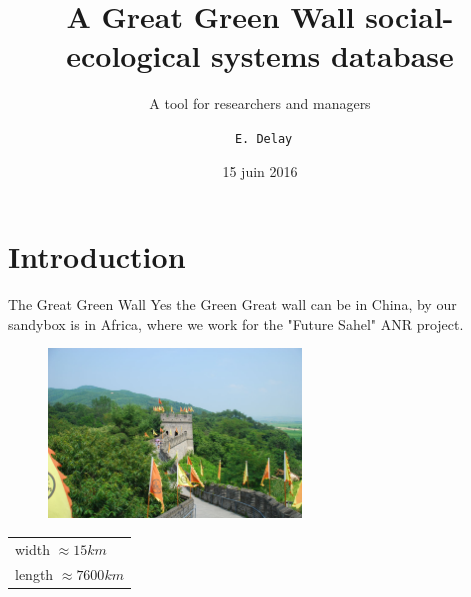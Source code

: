 \documentclass[newPxFont]{beamer}
\title{A Great Green Wall social-ecological systems database}
\subtitle{A tool for researchers and managers}
\date{15 juin 2016}
\author{\texttt{ E. Delay}}
\institute{\textsc{Ohmi} Téssékéré - Sénégal\\
\textsc{Geolab}, Université de Clermont-Auvergne.}
\newcommand{\tabitem}{%
  \usebeamertemplate{itemize item}\hspace*{\labelsep}}
\begin{document}
%
%

\maketitle


%
%


\section{Introduction}

\begin{frame}[c]{The Great Green Wall}
\vspace{-1cm}
Yes the Green Great wall can be in China, by our sandybox is in Africa, where we work for the "Future Sahel" ANR project.
\begin{figure}
	\centering
	\includegraphics[width = 0.6\textwidth]{img/great_wall}
\end{figure}
\begin{center}
    \begin{tabular}{@{}l@{}}
       \\
      \tabitem width $\approx 15 km$ \\
      \tabitem length $\approx 7600km$
  \end{tabular}
\end{center}
\end{frame}
\end{document}
